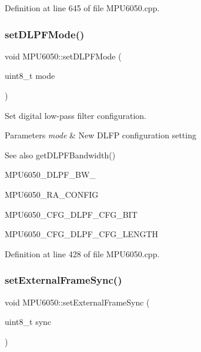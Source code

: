 Definition at line 645 of file M\+P\+U6050.\+cpp.

\mbox{\label{classMPU6050_a7a782ade8af2f88dfef7171487f59a3b}} 
\subsubsection{\texorpdfstring{setDLPFMode()}{setDLPFMode()}}
{\footnotesize\ttfamily void M\+P\+U6050\+::set\+D\+L\+P\+F\+Mode (\begin{DoxyParamCaption}\item[{uint8\+\_\+t}]{mode }\end{DoxyParamCaption})}



Set digital low-\/pass filter configuration. 


\begin{DoxyParams}{Parameters}
{\em mode} & New D\+L\+FP configuration setting \\
\hline
\end{DoxyParams}
\begin{DoxySeeAlso}{See also}
get\+D\+L\+P\+F\+Bandwidth() 

M\+P\+U6050\+\_\+\+D\+L\+P\+F\+\_\+\+B\+W\+\_ 

M\+P\+U6050\+\_\+\+R\+A\+\_\+\+C\+O\+N\+F\+IG 

M\+P\+U6050\+\_\+\+C\+F\+G\+\_\+\+D\+L\+P\+F\+\_\+\+C\+F\+G\+\_\+\+B\+IT 

M\+P\+U6050\+\_\+\+C\+F\+G\+\_\+\+D\+L\+P\+F\+\_\+\+C\+F\+G\+\_\+\+L\+E\+N\+G\+TH 
\end{DoxySeeAlso}


Definition at line 428 of file M\+P\+U6050.\+cpp.

\mbox{\label{classMPU6050_a77b36f41c531a11b5a835fc75a9aefe6}} 
\subsubsection{\texorpdfstring{setExternalFrameSync()}{setExternalFrameSync()}}
{\footnotesize\ttfamily void M\+P\+U6050\+::set\+External\+Frame\+Sync (\begin{DoxyParamCaption}\item[{uint8\+\_\+t}]{sync }\end{DoxyParamCaption})}



